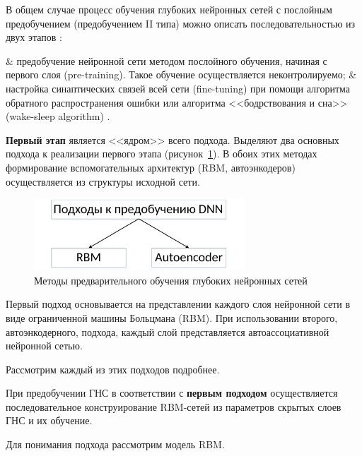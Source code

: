 В общем случае процесс обучения глубоких нейронных сетей с послойным предобучением (предобучением II типа) можно описать последовательностью из двух этапов \cite{n1, n2, n3, n4}: 
\begin{easylistNum}
	& предобучение нейронной сети методом послойного обучения, начиная с первого слоя  (pre-training). Такое обучение осуществляется неконтролируемо;
	& настройка синаптических связей всей сети (fine-tuning) при помощи алгоритма обратного распространения ошибки или алгоритма <<бодрствования и сна>> (wake-sleep algorithm) \cite{hinton1995}.
\end{easylistNum}

\textbf{Первый этап} является <<ядром>> всего подхода.
Выделяют два основных подхода к реализации первого этапа (рисунок~\ref{fig:pic1_2}). 
В обоих этих методах формирование вспомогательных архитектур (RBM, автоэнкодеров) осуществляется из структуры исходной сети. 

\begin{figure}[H]
  \centering
  \includegraphics[width=0.7\textwidth]{man-source/images/ch1/pic1-2.pdf}
  \caption{Методы предварительного обучения глубоких нейронных сетей}
  \label{fig:pic1_2}
\end{figure}

Первый подход основывается на представлении каждого слоя нейронной сети в виде ограниченной машины Больцмана (RBM). При использовании второго, автоэнкодерного, подхода, каждый слой  представляется автоассоциативной нейронной сетью.

Рассмотрим каждый из этих подходов подробнее.

\def\slantfrac#1#2{ \hspace{3pt}\!^{#1}\!\!\hspace{1pt}/
  \hspace{2pt}\!\!_{#2}\!\hspace{3pt}
}

При предобучении ГНС в соответствии с \textbf{первым подходом} осуществляется последовательное конструирование RBM-сетей из параметров скрытых слоев ГНС и их обучение. 

Для понимания подхода рассмотрим модель RBM.

